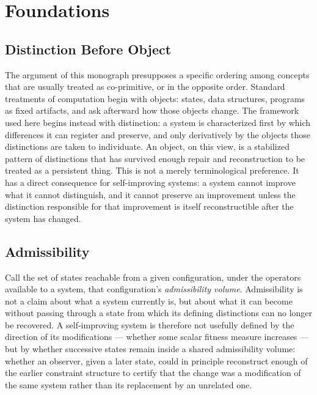 \documentclass[11pt]{book}
\begin{document}
\newpage
\tableofcontents

\mainmatter

\chapter{Foundations}
\label{ch:foundations}

\section{Distinction Before Object}

The argument of this monograph presupposes a specific ordering among concepts that are usually treated as co-primitive, or in the opposite order. Standard treatments of computation begin with objects: states, data structures, programs as fixed artifacts, and ask afterward how those objects change. The framework used here begins instead with distinction: a system is characterized first by which differences it can register and preserve, and only derivatively by the objects those distinctions are taken to individuate. An object, on this view, is a stabilized pattern of distinctions that has survived enough repair and reconstruction to be treated as a persistent thing. This is not a merely terminological preference. It has a direct consequence for self-improving systems: a system cannot improve what it cannot distinguish, and it cannot preserve an improvement unless the distinction responsible for that improvement is itself reconstructible after the system has changed.

\section{Admissibility}

Call the set of states reachable from a given configuration, under the operators available to a system, that configuration's \emph{admissibility volume}. Admissibility is not a claim about what a system currently is, but about what it can become without passing through a state from which its defining distinctions can no longer be recovered. A self-improving system is therefore not usefully defined by the direction of its modifications --- whether some scalar fitness measure increases --- but by whether successive states remain inside a shared admissibility volume: whether an observer, given a later state, could in principle reconstruct enough of the earlier constraint structure to certify that the change was a modification of the same system rather than its replacement by an unrelated one.
\end{document}
